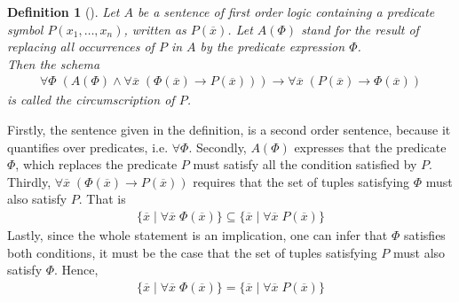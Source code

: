 \documentclass{article}
\newtheorem{mydef}[thm]{Definition}
\begin{document}
\begin{mydef}[\cite{mccarthy1981circumscription}]
Let $A$ be a sentence of first order logic containing a predicate symbol $P(x_1, \dots, x_n)$, written as $P(\overline{x})$. Let $A(\Phi)$ stand for the result of replacing all occurrences of $P$ in $A$ by the predicate expression $\Phi$. \\
Then the schema
\begin{equation*}
\begin{split}
\forall \Phi \; (A(\Phi) \wedge  \forall \overline{x} \; (\Phi(\overline{x})\to P(\overline{x}))) \to \forall \overline{x} \; (P(\overline{x}) \to \Phi(\overline{x}))
\end{split}
\end{equation*}
is called the circumscription of $P$.
\end{mydef} 
Firstly, the sentence given in the definition, is a second order sentence, because it quantifies over predicates, i.e. $\forall \Phi$. Secondly, $A(\Phi)$ expresses that the predicate $\Phi$, which replaces the predicate $P$ must satisfy all the condition satisfied by $P$. Thirdly, $\forall \overline{x} \; (\Phi(\overline{x})\to P(\overline{x}))$ requires that the set of tuples satisfying $\Phi$ must also satisfy $P$. That is  
\begin{equation*}
\begin{split}
\{\overline{x} \mid \forall \overline{x} \; \Phi(\overline{x}) \} \subseteq
\{\overline{x} \mid \forall \overline{x} \; P(\overline{x}) \} 
\end{split}
\end{equation*} 
Lastly, since the whole statement is an implication, one can infer that $\Phi$ satisfies both conditions, it must be the case that the set of tuples satisfying $P$ must also satisfy $\Phi$. Hence, 
\begin{equation*}
\begin{split}
\{\overline{x} \mid \forall \overline{x} \; \Phi(\overline{x}) \} =
\{\overline{x} \mid \forall \overline{x} \; P(\overline{x}) \} 
\end{split}
\end{equation*} 
\end{document}
